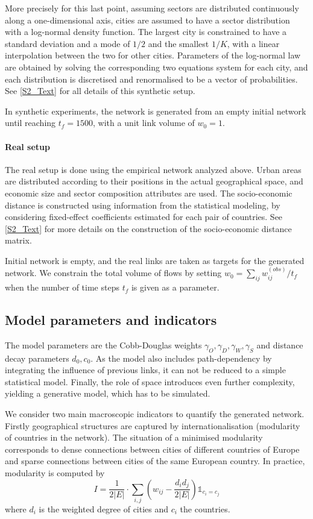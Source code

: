 \documentclass[10pt,letterpaper]{article}
\begin{document}
More precisely for this last point, assuming sectors are distributed continuously along a one-dimensional axis, cities are assumed to have a sector distribution with a log-normal density function. The largest city is constrained to have a standard deviation and a mode of $1/2$ and the smallest $1/K$, with a linear interpolation between the two for other cities. Parameters of the log-normal law are obtained by solving the corresponding two equations system for each city, and each distribution is discretised and renormalised to be a vector of probabilities. See \ref{S2_Text} for all details of this synthetic setup.

In synthetic experiments, the network is generated from an empty initial network until reaching $t_f=1500$, with a unit link volume of $w_0 = 1$.

     
\paragraph{Real setup}

The real setup is done using the empirical network analyzed above. Urban areas are distributed according to their positions in the actual geographical space, and economic size and sector composition attributes are used. The socio-economic distance is constructed using information from the statistical modeling, by considering fixed-effect coefficients estimated for each pair of countries. See \ref{S2_Text} for more details on the construction of the socio-economic distance matrix.

Initial network is empty, and the real links are taken as targets for the generated network. We constrain the total volume of flows by setting $w_0 = \sum_{ij} w_{ij}^{(obs)} / t_{f}$ when the number of time steps $t_f$ is given as a parameter.


\subsection*{Model parameters and indicators}

The model parameters are the Cobb-Douglas weights $\gamma_O,\gamma_D,\gamma_W,\gamma_S$ and distance decay parameters $d_0,c_0$. As the model also includes path-dependency by integrating the influence of previous links, it can not be reduced to a simple statistical model. Finally, the role of space introduces even further complexity, yielding a generative model, which has to be simulated.

We consider two main macroscopic indicators to quantify the generated network. Firstly geographical structures are captured by internationalisation (modularity of countries in the network). The situation of a minimised modularity corresponds to dense connections between cities of different countries of Europe and sparse connections between cities of the same European country. In practice, modularity is computed by
\begin{equation}
    I = \frac{1}{2 \left|E\right|} \cdot \sum_{i,j} \left(w_{ij} - \frac{d_i d_j}{2 \left|E\right|}\right) \mathbb{1}_{c_i = c_j}
\end{equation}
where $d_i$ is the weighted degree of cities and $c_i$ the countries.
\end{document}
